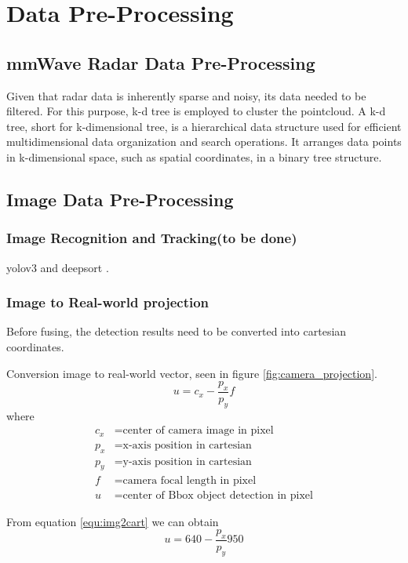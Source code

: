 \section{Data Pre-Processing}\label{sec:2-preprocessing}
\subsection{mmWave Radar Data Pre-Processing}\label{sec:2-kd_tree}
Given that radar data is inherently sparse and noisy, its data needed to be filtered.
For this purpose, k-d tree is employed to cluster the pointcloud.
A k-d tree, short for k-dimensional tree, is a hierarchical data structure used for efficient multidimensional data organization and search operations. 
It arranges data points in k-dimensional space, such as spatial coordinates, in a binary tree structure. 

\subsection{Image Data Pre-Processing}\label{sec:2-img_recognition}
\subsubsection{Image Recognition and Tracking\small(to be done)}
yolov3 \cite{redmon2018yolov3} and deepsort \cite{Wojke2017simple}.
\subsubsection{Image to Real-world projection}
Before fusing, the detection results need to be converted into cartesian coordinates.

Conversion image to real-world vector, seen in figure \ref{fig:camera_projection}.
\begin{equation}\label{equ:img2cart}
u=c_x-\frac{p_x}{p_y}f
\end{equation}
where
\begin{align*}
    c_x &=\text{center of camera image in pixel}\\
    p_x &=\text{x-axis position in cartesian}\\
    p_y &=\text{y-axis position in cartesian}\\
    f &=\text{camera focal length in pixel}\\
    u &=\text{center of Bbox object detection in pixel}
\end{align*}

From equation \ref{equ:img2cart} we can obtain
\begin{equation}\label{equ:2_img2cart2}
    u=640-\frac{p_x}{p_y}950
\end{equation}

